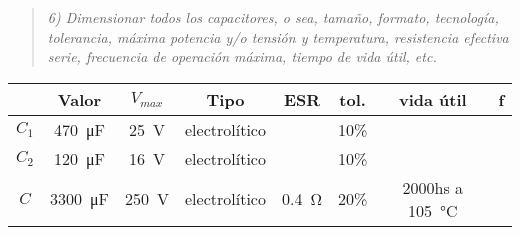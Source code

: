\begin{quote} \textit{6) Dimensionar todos los capacitores, o sea, tamaño, formato, tecnología, tolerancia, máxima potencia y/o tensión y temperatura, resistencia efectiva serie, frecuencia de operación máxima, tiempo de vida útil, etc.}
\end{quote}
\begin{table}[H]
	\centering
	\begin{tabular}{cccccccc}
		\toprule
		& Valor & $V_{max}$ & Tipo & ESR & tol. & vida útil &f \\
		\midrule
		$C_1$ & \SI{470}{\micro\farad} & \SI{25}{\volt} & electrolítico &  & 10\% & &  \\
		$C_2$ &\SI{120}{\micro\farad} & \SI{16}{\volt} & electrolítico & & 10\% & &\\
		$C$ &\SI{3300}{\micro\farad} & \SI{250}{\volt} & electrolítico & \SI{0.4}{\ohm} & 20\% &  2000hs a \SI{105}{\celsius} & \\
		\bottomrule
	\end{tabular}
\end{table}
